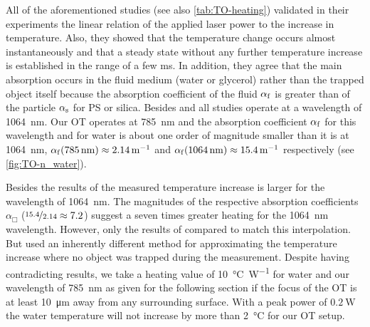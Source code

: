 All of the aforementioned studies (see also \cref{tab:TO-heating}) validated in 
their experiments the linear relation of the applied laser power to the 
increase in temperature. Also, they showed that the temperature change occurs 
almost instantaneously and that a steady state without any further temperature 
increase is established in the range of a few \si{\ms}. In addition, they agree 
that the main absorption occurs in the fluid medium (water or glycerol) rather 
than the trapped object itself because the absorption coefficient of the fluid 
$\alpha_{\mathrm{f}}$ is greater than of the particle $\alpha_{\mathrm{s}}$ for PS or 
silica. Besides  and  all studies operate 
at a wavelength of \SI{1064}{\nm}. Our OT operates at \SI{785}{\nm} and the 
absorption coefficient $\alpha_{\mathrm{f}}$ for this wavelength and for water is 
about one order of magnitude smaller than it is at \SI{1064}{\nm},
$\alpha_{\MR{f}}(\SI{785}{\nm}) \approx \SI{2.14}{\per\meter} $ and 
$\alpha_{\MR{f}}(\SI{1064}{\nm}) \approx \SI{15.4}{\per\meter} $ respectively 
(see \cref{fig:TO-n_water}).

Besides the results of  the measured temperature increase 
is larger for the wavelength of \SI{1064}{\nm}. The magnitudes of the 
respective absorption coefficients $\alpha_{\Box}$ 
($\nicefrac{15.4}{2.14}\approx 7.2$) suggest a seven times greater heating for 
the \SI{1064}{\nm} wavelength. However, only the results of 
 compared to  match this interpolation. 
But  used an inherently different method for approximating 
the temperature increase where no object was trapped during the measurement. 
Despite having contradicting results, we take a heating value of 
\SI{10}{\degreeCelsius\per\watt} for water and our wavelength of \SI{785}{\nm} 
as given for the following section if the focus of the OT is at least 
\SI{10}{\um} away from any surrounding surface. With a peak power of 
$\SI{0.2}{\watt}$ the water temperature will not increase by more than 
\SI{2}{\degreeCelsius} for our OT setup.

